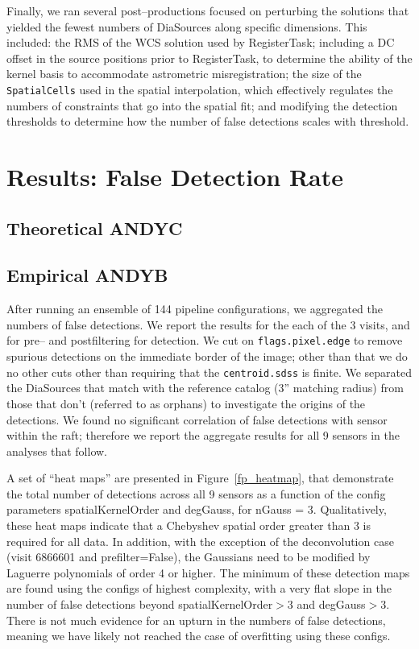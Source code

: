 \documentclass[prd, nofootinbib, floatfix, 11pt,tightenlines,times]{article}
\begin{document}
Finally, we ran several post--productions focused on perturbing the
solutions that yielded the fewest numbers of DiaSources along specific
dimensions.  This included: the RMS of the WCS solution used by
RegisterTask; including a DC offset in the source positions prior to
RegisterTask, to determine the ability of the kernel basis to
accommodate astrometric misregistration; the size of the {\tt
  SpatialCells} used in the spatial interpolation, which effectively
regulates the numbers of constraints that go into the spatial fit; and
modifying the detection thresholds to determine how the number of
false detections scales with threshold.


\section{Results: False Detection Rate}

\subsection{Theoretical {\bf ANDYC}\label{sec-analyticfp}}

\subsection{Empirical {\bf ANDYB}}

After running an ensemble of 144 pipeline configurations, we
aggregated the numbers of false detections.  We report the results for
the each of the 3 visits, and for pre-- and postfiltering for
detection.  We cut on {\tt flags.pixel.edge} to remove spurious
detections on the immediate border of the image; other than that we do
no other cuts other than requiring that the {\tt centroid.sdss} is
finite.  We separated the DiaSources that match with the reference
catalog (3'' matching radius) from those that don't (referred to as
orphans) to investigate the origins of the detections.  We found no
significant correlation of false detections with sensor within the
raft; therefore we report the aggregate results for all 9 sensors in
the analyses that follow.

A set of ``heat maps'' are presented in Figure~\ref{fp_heatmap}, that
demonstrate the total number of detections across all 9 sensors as a
function of the config parameters spatialKernelOrder and degGauss, for
nGauss = 3.  Qualitatively, these heat maps indicate that a Chebyshev
spatial order greater than 3 is required for all data.  In addition,
with the exception of the deconvolution case (visit 6866601 and
prefilter=False), the Gaussians need to be modified by Laguerre
polynomials of order 4 or higher.  The minimum of these detection maps
are found using the configs of highest complexity, with a very flat
slope in the number of false detections beyond spatialKernelOrder$>$3
and degGauss$>$3.  There is not much evidence for an upturn in the
numbers of false detections, meaning we have likely not reached the
case of overfitting using these configs.
\end{document}

